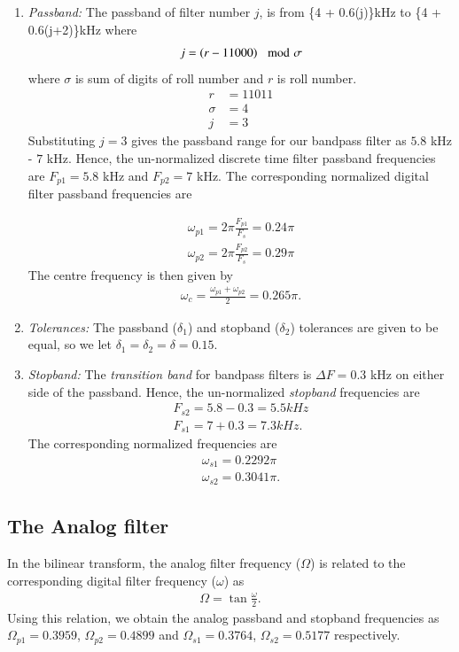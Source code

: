 \documentclass{article}
\begin{document}
\begin{enumerate}

\item {\em Passband:}  The passband of filter number $j$, is from \{4 + 0.6(j)\}kHz
to \{4 + 0.6(j+2)\}kHz where 
\begin{align}
    j=\left(r-11000\right) \mod \sigma
\end{align}
where $\sigma$ is sum of digits of roll number and $r$ is roll number.\\
\begin{align}
    r&=11011\\
    \sigma  &= 4\\
    j&=3
\end{align}  
Substituting $j = 3$ gives the passband range for our bandpass filter as $5.8$ kHz - $7$ kHz. 
 Hence, the un-normalized discrete time filter passband frequencies are $F_{p1} = 5.8$ kHz
and $F_{p2} = 7$ kHz.  The corresponding normalized digital filter passband frequencies are

\begin{align}
\omega_{p1} = 2\pi\frac{F_{p1}}{F_s}  = 0.24\pi  \\
 \omega_{p2} = 2\pi\frac{F_{p2}}{F_s}  = 0.29\pi
\end{align}  
 The centre frequency is then given by  
 \begin{align}
 \omega_c = \frac{\omega_{p1} + \omega_{p2}}{2} = 0.265\pi.  
 \end{align}

\item {\em Tolerances:}  The passband ($\delta_1$) and stopband ($\delta_2$) tolerances are given to
be equal, so we let $\delta_1 = \delta_2 = \delta = 0.15$.

\item {\em Stopband:}  The {\em transition band} for bandpass filters is $\Delta F = 0.3$ kHz on either side of the passband.
Hence, the un-normalized {\em stopband} frequencies are  
\begin{align}
F_{s2} = 5.8- 0.3 = 5.5 kHz \\
F_{s1} = 7 + 0.3 = 7.3 kHz .
 \end{align} 
The corresponding normalized frequencies are
\begin{align}
\omega_{s1} =  0.2292\pi \\
\omega_{s2} = 0.3041 \pi.
\end{align}
\end{enumerate}

\subsection{\textbf{The Analog filter}} \label{2.2}
In the bilinear transform, the analog filter frequency ($\Omega$) is related to the corresponding digital filter frequency ($\omega$) as
\begin{align}
\Omega = \tan \frac{\omega}{2}.
\end{align} 
 Using this relation, we obtain the analog passband and stopband frequencies as $\Omega_{p1} =0.3959 $, $\Omega_{p2} = 0.4899$ and $\Omega_{s1} = 0.3764$, $\Omega_{s2} =0.5177 $
respectively.
\end{document}

